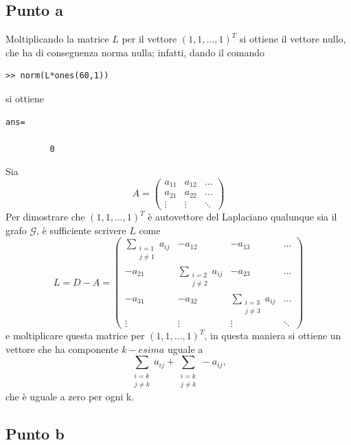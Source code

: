 \documentclass[11pt,a4paper,twoside,openright,titlepage,
                           headinclude,footinclude,BCOR5mm,
                           numbers=noenddot,cleardoublepage=empty,
                           tablecaptionabove]{scrbook}
\begin{document}
\subsection{\textbf{Punto a}}
Moltiplicando la matrice $L$ per il vettore $(1,1,\dots,1)^T$ si ottiene il vettore nullo, che ha di conseguenza norma nulla; infatti, dando il comando
\begin{lstlisting}[frame=lines]
>> norm(L*ones(60,1))
\end{lstlisting}
si ottiene
\begin{lstlisting}[frame=lines]
ans=

         0
\end{lstlisting}
Sia 
\[
A=
\begin{pmatrix}
a_{11} & a_{12} & \dots \\
a_{21} & a_{22} & \dots \\
\vdots & \vdots & \ddots
\end{pmatrix}
\]
Per dimostrare che $(1,1,\dots,1)^T$ è autovettore del Laplaciano qualunque sia il grafo $\mathcal{G}$, è sufficiente scrivere $L$ come 
\[
L=D-A=
\begin{pmatrix}
\displaystyle\sum_{\substack{i=1 \\ j \ne 1}} a_{ij} & -a_{12} & -a_{13} & \dots \\
-a_{21} & \displaystyle\sum_{\substack{i=2 \\ j \ne 2}} a_{ij} & -a_{23} & \dots \\
-a_{31} & -a_{32} & \displaystyle\sum_{\substack{i=3 \\ j \ne 3}} a_{ij} & \dots \\
\vdots  & \vdots & \vdots & \ddots
\end{pmatrix}
\] 
e moltiplicare questa matrice per $(1,1,\dots,1)^T$, in questa maniera si ottiene un vettore che ha componente $k-esima$ uguale a 
\[
\displaystyle\sum_{\substack{i=k \\ j \ne k}} a_{ij} + \displaystyle\sum_{\substack{i=k \\ j \ne k}} -a_{ij},
\]
che è uguale a zero per ogni k.

\subsection{\textbf{Punto b}}
\end{document}
